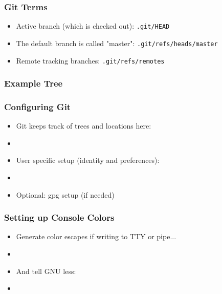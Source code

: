 \begin{slide}[fragile]
  \frametitle{Git Terms}
  \begin{itemize}
     \item Active branch (which is checked out): {\footnotesize{\verb+.git/HEAD+}}
     \item The default branch is called "master": {\footnotesize{\verb+.git/refs/heads/master+}}
     \item Remote tracking branches: {\footnotesize{\verb+.git/refs/remotes+}}
  \end{itemize}
\end{slide}

\begin{slide}
  \frametitle{Example Tree}
\end{slide}

\begin{slide}[fragile]
  \frametitle{Configuring Git}
  \begin{itemize}
    \item Git keeps track of trees and locations here:
    \item[]
    \item User specific setup (identity and preferences):
    \item[]
    \item Optional: gpg setup (if needed)
  \end{itemize}
\end{slide}

\begin{slide}[fragile]
  \frametitle{Setting up Console Colors}
  \begin{itemize}
  \item Generate color escapes if writing to TTY or pipe...
  \item[]
  \item And tell GNU less:
  \item[]
  \end{itemize}
\end{slide}

